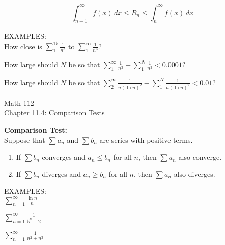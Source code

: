 \documentclass[11pt]{article}
\begin{document}
\begin{displaymath}
\int_{n+1}^{\infty}f(x) \, dx  \leq R_n \leq \int_n^{\infty} f(x) \, dx
  \end{displaymath}

\vspace{1.75in}

\pagebreak

EXAMPLES: \\

How close is $\sum_1^{15}\frac{1}{n^3}$ to $\sum_1^{\infty}\frac{1}{n^3}$?

\vspace{1.5in}

How large should $N$ be so that $\sum_1^{\infty}\frac{1}{n^3}- \sum_1^{N}\frac{1}{n^3} < 0.0001$?

\vspace{1.5in}

How large should $N$ be so that $\sum_2^{\infty}\frac{1}{n(\ln{n})^2}- \sum_1^{N}\frac{1}{n(\ln{n})^2} < 0.01$?

\pagebreak

\begin{center}
\Large
\rm{Math 112}
\\
\rm{Chapter 11.4:  Comparison Tests}
\\
\end{center}

{\bf Comparison Test:}  \\

Suppose that $\sum a_n$ and $\sum b_n$ are series with positive terms.
\begin{enumerate}
\item{If $\sum b_n$ converges and $a_n \leq b_n$ for all $n$, then $\sum a_n$ also converge.}
  \item{If $\sum b_n$ diverges and $a_n \geq b_n$ for all $n$, then $\sum a_n$ also diverges.}
\end{enumerate}

\vspace{0.2in}

EXAMPLES:\\

$\sum_{n=1}^{\infty} \frac{\ln{n}}{n} $

\vspace{1.5in}

$\sum_{n=1}^{\infty} \frac{1}{5^n + 2} $

\vspace{1.5in}

$\sum_{n=1}^{\infty} \frac{1}{n^2 + n^3} $
\end{document}
